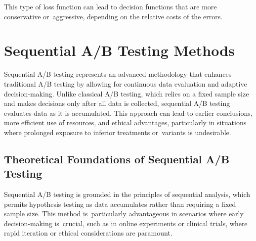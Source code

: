 \documentclass[magisterska, english]{pwr_wmat_praca_dyplomowa}
\theoremstyle{plain}
\numberwithin{theorem}{chapter}
\theoremstyle{definition}
\numberwithin{theorem}{chapter}
\begin{document}
This type of loss function can lead to decision functions that are more conservative or~aggressive, depending on the relative costs of the errors.
%


\section{Sequential A/B Testing Methods}

Sequential A/B testing represents an advanced methodology that enhances traditional A/B testing by allowing for continuous data evaluation and adaptive decision-making. Unlike classical A/B testing, which relies on a fixed sample size and makes decisions only after all data is collected, sequential A/B testing evaluates data as it is accumulated. This approach can lead to earlier conclusions, more efficient use of resources, and ethical advantages, particularly in situations where prolonged exposure to inferior treatments or~variants is undesirable.

\subsection{Theoretical Foundations of Sequential A/B Testing}

Sequential A/B testing is grounded in the principles of sequential analysis, which permits hypothesis testing as data accumulates rather than requiring a fixed sample size. This method is~particularly advantageous in scenarios where early decision-making is~crucial, such as in online experiments or clinical trials, where rapid iteration or ethical considerations are paramount.
\end{document}

